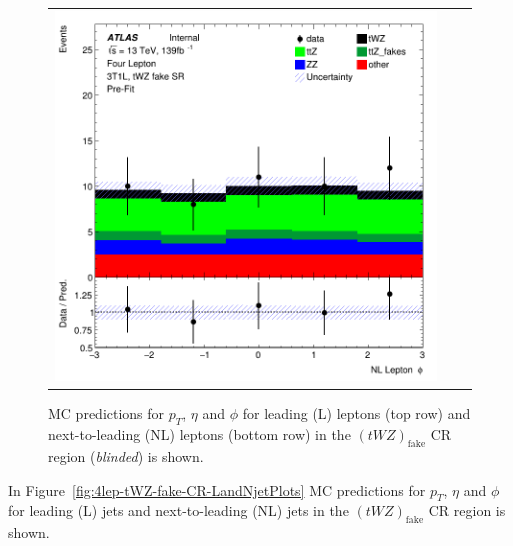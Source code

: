 \begin{figure}[htbp]
\begin{tabular}{ccc}
    \includegraphics[width=.3\textwidth]{figures/PreFitPlots/lep4_tWZ_3T1L_NL_lepton_phi.png} \\

  \end{tabular}
    \caption{MC predictions for $p_{T}$, $\eta$ and $\phi$ for leading (L) leptons (top row) and next-to-leading (NL) leptons (bottom row) in the $(tWZ)_{\text{fake}}$ CR region (\textit{blinded}) is shown.}
  \label{fig:4lep-tWZ-fake-CR-leptonPlots}
\end{figure}

In Figure~\ref{fig:4lep-tWZ-fake-CR-LandNjetPlots} MC predictions for $p_{T}$, $\eta$ and $\phi$ for leading (L) jets and next-to-leading (NL) jets in the $(tWZ)_{\text{fake}}$ CR region is shown.

